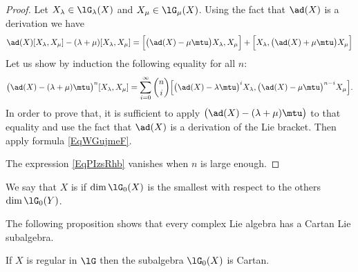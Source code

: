 \begin{proof}
	Let \( X_{\lambda}\in\lG_{\lambda}(X)\) and \( X_{\mu}\in\lG_{\mu}(X)\). Using the fact that \( \ad(X)\) is a derivation we have
	\begin{equation}
		\ad(X)[X_{\lambda},X_{\mu}]-(\lambda+\mu)[X_{\lambda},X_{\mu}]=\Big[ \big( \ad(X)-\mu\mtu \big)X_{\lambda},X_{\mu} \Big]+\Big[ X_{\lambda},\big( \ad(X)+\mu\mtu \big)X_{\mu} \Big]
	\end{equation}
	Let us show by induction the following equality for all \( n\):
	\begin{equation}    \label{EqPIzsRhb}
		\big( \ad(X)-(\lambda+\mu)\mtu \big)^n[X_{\lambda},X_{\mu}]=\sum_{i=0}^{\infty}\binom{ n }{ i }\Big[ \big( \ad(X)-\lambda\mtu \big)^iX_{\lambda},\big( \ad(X)-\mu\mtu \big)^{n-i}X_{\mu} \Big].
	\end{equation}
	In order to prove that, it is sufficient to apply \( \big( \ad(X)-(\lambda+\mu)\mtu \big)\) to that equality and use the fact that \( \ad(X)\) is a derivation of the Lie bracket. Then apply formula \eqref{EqWGujmeF}.

	The expression \eqref{EqPIzsRhb} vanishes when \( n\) is large enough.
\end{proof}

We say that \( X\) is  if \( \dim\lG_0(X)\) is the smallest with respect to the others \( \dim\lG_0(Y)\).

The following proposition shows that every complex Lie algebra has a Cartan Lie subalgebra.
\begin{proposition}
	If $X$ is regular in \( \lG\) then the subalgebra \( \lG_0(X)\) is Cartan.
\end{proposition}

